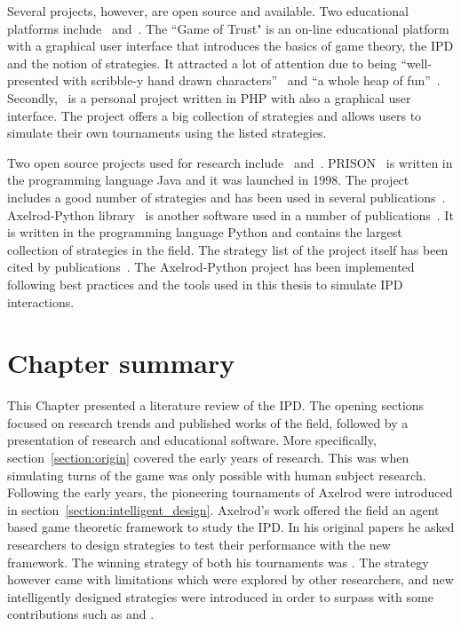Several projects, however, are open source and available. Two educational
platforms include~\cite{pd_trust} and~\cite{pd_game}. The ``Game of Trust"
\cite{pd_trust} is an on-line educational platform with a graphical user
interface that introduces the basics of game theory, the IPD and the notion of
strategies. It attracted a lot of attention due to being ``well-presented with
scribble-y hand drawn characters''~\cite{trust_blogb} and ``a whole heap of
fun''~\cite{trust_bloga}. Secondly,~\cite{pd_game} is a personal project written
in PHP with also a graphical user interface. The project offers a big collection of
strategies and allows users to simulate their own tournaments using the listed
strategies.

Two open source projects used for research include~\cite{prison}
and~\cite{axelrodproject}. PRISON~\cite{prison} is written in the programming
language Java and it was launched in 1998. The project includes a good number of
strategies and has been used in several publications~\cite{Beaufils1997,
Beaufils1988, Mathieu1999, Mathieu2019}. Axelrod-Python
library~\cite{axelrodproject} is another software used in a number of
publications~\cite{Gaffney2019, Goodman2018, Knight2017, Knight2016, KnightHGC17,
O2019, Wang20170}. It is written in the programming language Python and
contains the largest collection of strategies in the field. The strategy list of
the project itself has been cited by publications~\cite{Anastassacos2018,
Hayes2017, Neumann2018}. The Axelrod-Python project has been implemented following
best practices and the tools used in this thesis to simulate IPD interactions.

\section{Chapter summary}

This Chapter presented a literature review of the IPD.
The opening sections focused on research trends and published works of
the field, followed by a presentation of research and educational software.
More specifically, section~\ref{section:origin}
covered the early years of research. This was when simulating turns of the game
was only possible with human subject research.
Following the early years, the pioneering tournaments of Axelrod were introduced in
section~\ref{section:intelligent_design}. Axelrod's work offered the field an
agent based game theoretic framework to study the IPD.
In his original papers he asked researchers to design strategies to test their
performance with the new framework. The winning strategy of both his tournaments
was \TitForTat. The strategy however came with limitations which were explored
by other researchers, and new intelligently designed strategies were introduced in
order to surpass \TitForTat with some contributions such as \Pavlov and \Gradual.

